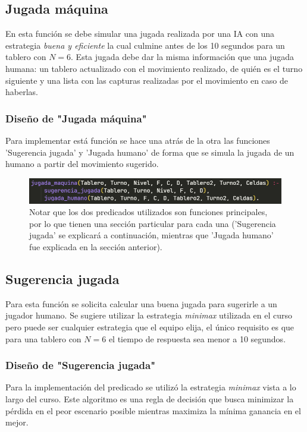 \documentclass[12pt]{article} %
\begin{document}
		\subsection{Jugada máquina}
		En esta función se debe simular una jugada realizada por una IA con una estrategia \textit{buena y eficiente} la cual culmine antes de los 10 segundos para un tablero con $N=6$. Esta jugada debe dar la misma información que una jugada humana: un tablero actualizado con el movimiento realizado, de quién es el turno siguiente y una lista con las capturas realizadas por el movimiento en caso de haberlas.
		
			\subsubsection{Diseño de "Jugada máquina"}
			Para implementar está función se hace una atrás de la otra las funciones 'Sugerencia jugada' y 'Jugada humano' de forma que se simula la jugada de un humano a partir del  movimiento sugerido.
		
			\begin{figure}[h!]
				\centering
				\includegraphics[width=0.9\linewidth]{"jugadamaquina"}
				\caption{Notar que los dos predicados utilizados son funciones principales, por lo que tienen una sección particular para cada una ('Sugerencia jugada' se explicará a continuación, mientras que 'Jugada humano' fue explicada en la sección anterior).}
			\end{figure}
		
		\subsection{Sugerencia jugada}
		Para esta función se solicita calcular una buena jugada para sugerirle a un jugador humano. Se sugiere utilizar la estrategia \textit{minimax} utilizada en el curso pero puede ser cualquier estrategia que el equipo elija, el único requisito es que para una tablero con $N=6$ el tiempo de respuesta sea menor a 10 segundos.
		
			\subsubsection{Diseño de "Sugerencia jugada"}
			Para la implementación del predicado se utilizó la estrategia \textit{minimax} vista a lo largo del curso. Este algoritmo es una regla de decisión que busca minimizar la pérdida en el peor escenario posible mientras maximiza la mínima ganancia en el mejor.
			
\end{document}
